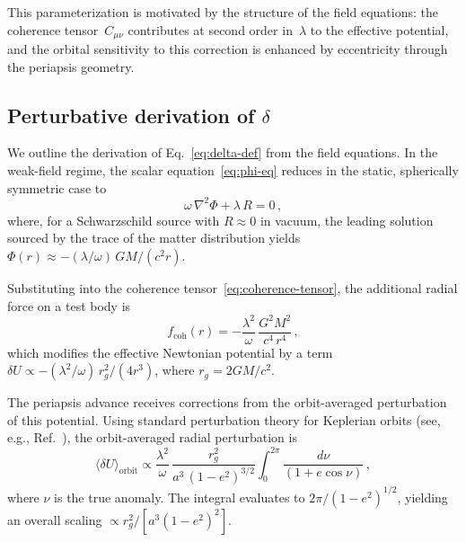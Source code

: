\documentclass[showpacs,preprintnumbers,amsmath,amssymb,prd,longbibliography]{revtex4-2}
\begin{document}
This parameterization is motivated by the structure of the
field equations: the coherence tensor~$C_{\mu\nu}$ contributes
at second order in~$\lambda$ to the effective potential,
and the orbital sensitivity to this correction is enhanced
by eccentricity through the periapsis geometry.

\subsection{Perturbative derivation of $\delta$}

We outline the derivation of Eq.~\eqref{eq:delta-def}
from the field equations.
In the weak-field regime,
the scalar equation~\eqref{eq:phi-eq} reduces in the
static, spherically symmetric case to
\begin{equation}
\omega\,\nabla^2\Phi + \lambda\,R = 0\,,
\label{eq:phi-static}
\end{equation}
where, for a Schwarzschild source with $R \approx 0$ in vacuum,
the leading solution sourced by the trace of the matter
distribution yields
$\Phi(r) \approx -(\lambda/\omega)\,GM/(c^2 r)$.

Substituting into the coherence tensor~\eqref{eq:coherence-tensor},
the additional radial force on a test body is
\begin{equation}
f_{\mathrm{coh}}(r) = -\frac{\lambda^2}{\omega}\,\frac{G^2 M^2}{c^4\,r^4}\,,
\end{equation}
which modifies the effective Newtonian potential by a term
$\delta U \propto -(\lambda^2/\omega)\,r_g^2/(4 r^3)$,
where $r_g = 2GM/c^2$.

The periapsis advance receives corrections from the
orbit-averaged perturbation of this potential.
Using standard perturbation theory for Keplerian orbits
(see, e.g., Ref.~\cite{Weinberg1972}), the orbit-averaged
radial perturbation is
\begin{equation}
\big\langle \delta U \big\rangle_{\mathrm{orbit}}
\propto \frac{\lambda^2}{\omega}\,
\frac{r_g^2}{a^3\,(1-e^2)^{3/2}}
\int_0^{2\pi}\!\frac{d\nu}{(1+e\cos\nu)}\,,
\end{equation}
where $\nu$ is the true anomaly.
The integral evaluates to $2\pi/(1-e^2)^{1/2}$, yielding
an overall scaling $\propto r_g^2/[a^3(1-e^2)^2]$.
\end{document}
